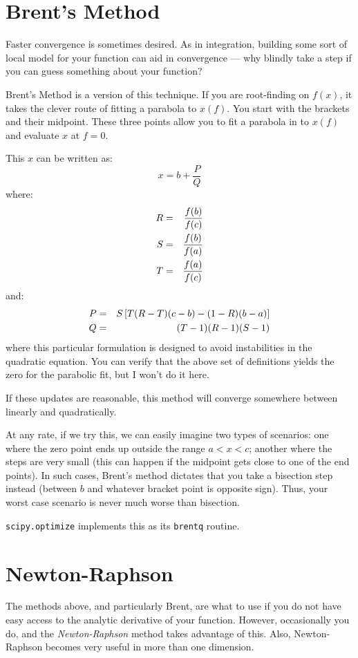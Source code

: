 \section{Brent's Method}

Faster convergence is sometimes desired. As in integration, building
some sort of local model for your function can aid in convergence ---
why blindly take a step if you can guess something about your
function? 

Brent's Method is a version of this technique. If you are root-finding
on $f(x)$, it takes the clever route of fitting a parabola to
$x(f)$. You start with the brackets and their midpoint.  These three
points allow you to fit a parabola in to $x(f)$ and evaluate $x$ at
$f=0$. 

This $x$ can be written as:
\begin{equation}
x = b + \frac{P}{Q}
\end{equation}
where:
\begin{eqnarray}
R &=& \frac{f(b)}{f(c)} \cr
S &=& \frac{f(b)}{f(a)} \cr
T &=& \frac{f(a)}{f(c)}
\end{eqnarray}
and:
\begin{eqnarray}
P &=& S\left[T(R-T)(c-b) - (1-R)(b-a)\right] \cr
Q &=& (T-1)(R-1)(S-1)
\end{eqnarray}
where this particular formulation is designed to avoid instabilities
in the quadratic equation. You can verify that the above set of
definitions yields the zero for the parabolic fit, but I won't do it
here.

If these updates are reasonable, this method will converge somewhere
between linearly and quadratically.

At any rate, if we try this, we can easily imagine two types of
scenarios: one where the zero point ends up outside the range $a<x<c$;
another where the steps are very small (this can happen if the
midpoint gets close to one of the end points). In such cases, Brent's
method dictates that you take a bisection step instead (between $b$
and whatever bracket point is opposite sign). Thus, your worst case
scenario is never much worse than bisection.

{\tt scipy.optimize} implements this as its {\tt brentq} routine.

\section{Newton-Raphson}

The methods above, and particularly Brent, are what to use if you
do not have easy access to the analytic derivative of your function. 
However, occasionally you do, and the {\it Newton-Raphson} method
takes advantage of this. Also, Newton-Raphson becomes very useful in
more than one dimension.

